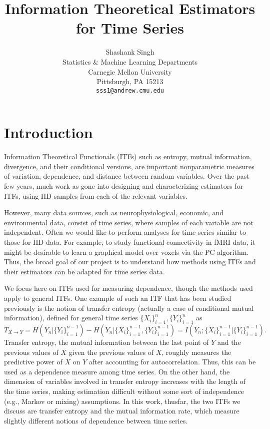 \documentclass{article} %
\title{Information Theoretical Estimators for Time Series}
\author{
Shashank Singh \\
Statistics \& Machine Learning Departments \\
Carnegie Mellon University \\
Pittsburgh, PA 15213 \\
\texttt{sss1@andrew.cmu.edu}
}
\begin{document}
\maketitle

\section{Introduction}
Information Theoretical Functionals (ITFs) such as entropy, mutual information,
divergence, and their conditional versions, are important nonparametric
measures of variation, dependence, and distance between random variables. Over
the past few years, much work as gone into designing and characterizing
estimators for ITFs, using IID samples from each of the relevant variables.

However, many data sources, such as neurophysiological, economic, and
environmental data, consist of time series, where samples of each variable are
not independent. Often we would like to perform analyses for time series
similar to those for IID data. For example, to study functional connectivity in
fMRI data, it might be desirable to learn a graphical model over voxels via the
PC algorithm. Thus, the broad goal of our project is to understand how methods
using ITFs and their estimators can be adapted for time series data.

We focus here on ITFs used for measuring dependence, though the methods used
apply to general ITFs. One example of such an ITF that has been studied
previously is the notion of transfer entropy (actually a case of conditional
mutual information), defined for general time series
$\{X_i\}_{i = 1}^n, \{Y_i\}_{i = 1}^n$ as
\[T_{X \to Y}
    = H(Y_n | \{Y_i\}_{i = 1}^{n - 1}) - H(Y_n | \{X_i\}_{i = 1}^{n - 1}, \{Y_i\}_{i = 1}^{n - 1})
    = I(Y_n; \{X_i\}_{i = 1}^{n - 1} | \{Y_i\}_{i = 1}^{n - 1}).
\]
Transfer entropy, the mutual information between the last point of $Y$ and the
previous values of $X$ given the previous values of $X$, roughly measures the
predictive power of $X$ on $Y$ after accounting for autocorrelation. Thus,
this can be used as a dependence measure among time series. On the other hand,
the dimension of variables involved in transfer entropy increases with the
length of the time series, making estimation difficult without some sort of
independence (e.g., Markov or mixing) assumptions. In this work, thusfar, the
two ITFs we discuss are transfer entropy and the mutual information rate, which
measure slightly different notions of dependence between time series.
\end{document}
